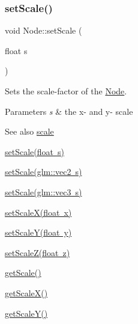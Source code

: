 \subsubsection{\texorpdfstring{setScale()}{setScale()}\hspace{0.1cm}{\footnotesize\ttfamily [1/3]}}
{\footnotesize\ttfamily void Node\+::set\+Scale (\begin{DoxyParamCaption}\item[{float}]{s }\end{DoxyParamCaption})}



Sets the scale-\/factor of the \mbox{\hyperlink{classsage_1_1Node}{Node}}. 


\begin{DoxyParams}{Parameters}
{\em s} & the x-\/ and y-\/ scale \\
\hline
\end{DoxyParams}
\begin{DoxySeeAlso}{See also}
\mbox{\hyperlink{classsage_1_1Node_a686c3edeea1faab8b566bfdf2fe3f906}{scale}} 

\mbox{\hyperlink{classsage_1_1Node_a939698b2eb68ee5b60b91e2426e95369}{set\+Scale(float s)}} 

\mbox{\hyperlink{classsage_1_1Node_aecff30b003ce1c2266cc60a34b72559d}{set\+Scale(glm\+::vec2 s)}} 

\mbox{\hyperlink{classsage_1_1Node_a7481b934a6ef259a14aee4d0b87cb2aa}{set\+Scale(glm\+::vec3 s)}} 

\mbox{\hyperlink{classsage_1_1Node_ab8126397f90ccdee0755b984b26809d8}{set\+Scale\+X(float x)}} 

\mbox{\hyperlink{classsage_1_1Node_afa22161545d63e9e011f8eeb5acdead7}{set\+Scale\+Y(float y)}} 

\mbox{\hyperlink{classsage_1_1Node_a5cc4be0b41e5a737cae73fff05e86857}{set\+Scale\+Z(float z)}} 

\mbox{\hyperlink{classsage_1_1Node_ac41e15cac1e23a4c48798291c70dcdd8}{get\+Scale()}} 

\mbox{\hyperlink{classsage_1_1Node_a27040ef8ab59ccf42b87d6ddc8d794e6}{get\+Scale\+X()}} 

\mbox{\hyperlink{classsage_1_1Node_ab87661ab8940512baf2e7639ea55ff87}{get\+Scale\+Y()}} 
\end{DoxySeeAlso}
\mbox{\label{classsage_1_1Node_aecff30b003ce1c2266cc60a34b72559d}} 
